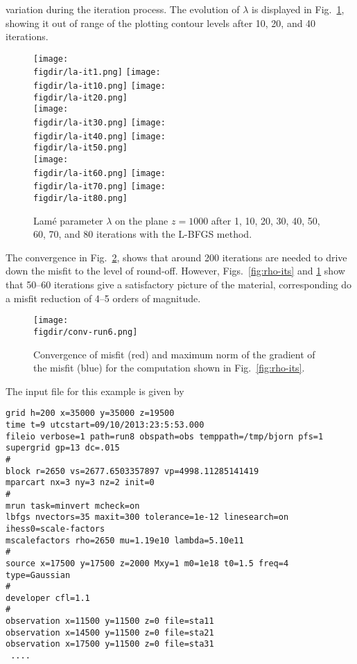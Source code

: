 \documentclass[12pt]{report}
\def\figdir{mfigs}
\begin{document}
variation during the iteration process. The evolution of $\lambda$ is displayed in Fig.~\ref{fig:lambda-its},
showing it out of range of the plotting contour levels after 10, 20, and 40 iterations.
\par
\begin{figure}
\begin{center}
\texttt{[image: \\figdir/la-it1.png]}\hfil
\texttt{[image: \\figdir/la-it10.png]}\hfil
\texttt{[image: \\figdir/la-it20.png]} \\
\texttt{[image: \\figdir/la-it30.png]}\hfil
\texttt{[image: \\figdir/la-it40.png]}\hfil
\texttt{[image: \\figdir/la-it50.png]} \\
\texttt{[image: \\figdir/la-it60.png]}\hfil
\texttt{[image: \\figdir/la-it70.png]}\hfil
\texttt{[image: \\figdir/la-it80.png]} \\
\caption{Lam\'e parameter $\lambda$ on the plane $z=1000$ after 1, 10, 20, 30, 40, 50, 60, 70, and 80 iterations
with the L-BFGS method.}
\label{fig:lambda-its}
\end{center}
\end{figure}
\par
The convergence in Fig.~\ref{fig:sine-conv}, shows that around 200 iterations are needed to drive down
the misfit to the level of round-off. However, Figs.~\ref{fig:rho-its} and \ref{fig:lambda-its} show that
50--60 iterations give a satisfactory picture of the material, corresponding do a misfit reduction of
4--5 orders of magnitude. 
\begin{figure}
\begin{center}
\texttt{[image: \\figdir/conv-run6.png]}\hfil
\caption{Convergence of misfit (red) and maximum norm of the gradient of the misfit (blue) for 
the computation shown in Fig.~\ref{fig:rho-its}.}
\label{fig:sine-conv}
\end{center}
\end{figure}
\par
The input file for this example is given by
\begin{verbatim}
grid h=200 x=35000 y=35000 z=19500
time t=9 utcstart=09/10/2013:23:5:53.000
fileio verbose=1 path=run8 obspath=obs temppath=/tmp/bjorn pfs=1
supergrid gp=13 dc=.015
#
block r=2650 vs=2677.6503357897 vp=4998.11285141419
mparcart nx=3 ny=3 nz=2 init=0
#
mrun task=minvert mcheck=on 
lbfgs nvectors=35 maxit=300 tolerance=1e-12 linesearch=on ihess0=scale-factors
mscalefactors rho=2650 mu=1.19e10 lambda=5.10e11 
#
source x=17500 y=17500 z=2000 Mxy=1 m0=1e18 t0=1.5 freq=4 type=Gaussian
#
developer cfl=1.1
#
observation x=11500 y=11500 z=0 file=sta11
observation x=14500 y=11500 z=0 file=sta21
observation x=17500 y=11500 z=0 file=sta31
 ....
\end{verbatim}
\end{document}
